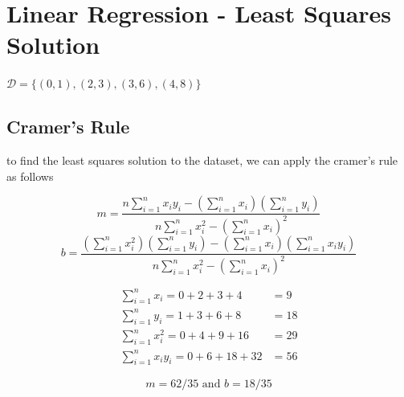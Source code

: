 \documentclass{article}
\begin{document}
\section{Linear Regression - Least Squares Solution}
    $\mathcal{D} = \{(0,1),(2,3),(3,6),(4,8)\}$
    \subsection{Cramer's Rule}
    to find the least squares solution to the dataset, we can apply the cramer's rule as follows
    
    \[ 
        m  = \frac{n\sum_{i=1}^n x_i y_i - (\sum_{i=1}^n x_i)(\sum_{i=1}^n y_i)}
        {n \sum_{i=1}^n x_i^2 - (\sum_{i=1}^n x_i)^2}  
    \]
    \[
        b = \frac{(\sum_{i=1}^n x_i^2)(\sum_{i=1}^n y_i) 
                    - (\sum_{i=1}^n x_i)(\sum_{i=1}^n x_i y_i)}
                 {n\sum_{i=1}^n x_i^2 - (\sum_{i=1}^n x_i)^2}
    \]

    \begin{align*}
        \sum_{i=1}^n x_i = 0 + 2 + 3 + 4 & = 9 \\
        \sum_{i=1}^n y_i = 1 + 3 + 6 + 8 & = 18 \\ 
        \sum_{i=1}^n x_i^2 = 0 + 4 + 9 + 16 & = 29 \\ 
        \sum_{i=1}^n x_i y_i = 0 + 6 + 18 + 32 & = 56 
    \end{align*}

    $$m = 62/35 \text{ and } b = 18/35$$
\end{document}

